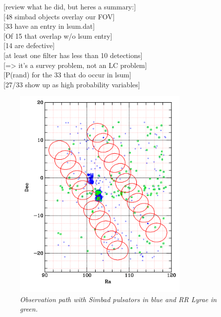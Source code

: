 \documentclass[aps,prl,twocolumn,superscriptaddress]{revtex4-1}
\begin{document}
~[review what he did, but heres a summary:]\\
~[48 simbad objects overlay our FOV]\\
~[33 have an entry in lsum.dat]\\
~[Of 15 that overlap w/o lsum entry]\\
~[14 are defective]\\
~[at least one filter has less than 10 detections]\\
~[=> it's a survey problem, not an LC problem]\\
~[P(rand) for the 33 that do occur in lsum]\\
~[27/33 show up as high probability variables]\\



\begin{figure}[H]
 \centering
 	\includegraphics[width=3.35in]{figures/simbadoverlap.png}
 \caption{\it \small{Observation path with Simbad pulsators in blue and RR Lyrae in green.}}
 \label{fig:simoverlap}
\end{figure}



\end{document}
